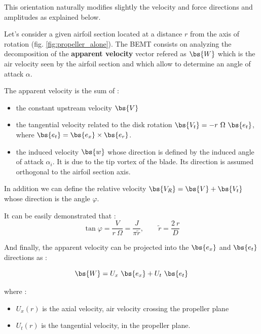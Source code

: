 

  This orientation naturally modifies slightly the velocity and force directions and amplitudes as explained below.


  Let's consider a given airfoil section located at a distance $r$ from the axis of rotation (fig. \ref{fig:propeller_alone}). 
  The BEMT consists on analyzing the decomposition of the \textbf{apparent velocity} vector refered as $\bs{W}$ 
  which is the air velocity seen by the airfoil section and
  which allow to determine an angle of attack $\alpha$.
  
  The apparent velocity is the sum of :
  \begin{itemize}
  \item the constant upstream  velocity $\bs{V}$
  
  \item the tangential velocity related to the disk rotation $\bs{V_t} = - r~\Omega~\bs{e_t}$,
  where $\bs{e_t} = \bs{e_x} \times \bs{e_r}$. 
  
  \item the induced velocity $\bs{w}$ whose direction is defined by the induced angle of attack $\alpha_i$. 
  It is due to the tip vortex of the blade. Its direction is assumed orthogonal to the airfoil section axis.   
  \end{itemize}
  
  
  In addition we can define the relative velocity $\bs{V_R} = \bs{V} + \bs{V_t}$ whose direction is the angle $\varphi$.

  It can be easily demonstrated that :
  \begin{equation}
  \tan \varphi =  \frac{V}{r~\Omega} = \dfrac{J}{\pi \tilde r}, \qquad \tilde r = \dfrac{2~r}{D} 
\label{eq:varphi_prop}  
\end{equation}
  
  And finally, the apparent velocity can be projected into the $\bs{e_x}$ and $\bs{e_t}$ directions as :
  
  \begin{equation}
  \bs{W} = U_x~\bs{e_x} + U_t~\bs{e_t}
  \label{eq:W_def2}
  \end{equation} 
  
  where :
  \begin{itemize}
    \item $U_x(r)$ is the axial velocity, air velocity crossing the propeller plane
    \item $U_t(r)$ is the tangential velocity, in the propeller plane. 
  \end{itemize}
  
